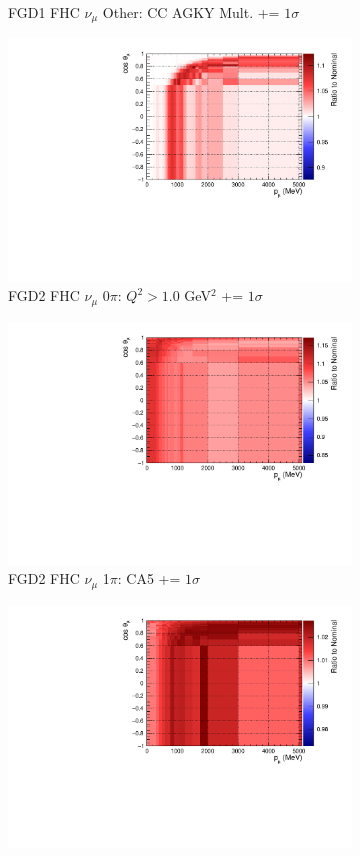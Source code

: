 \begin{figure}[!htbp]
\begin{subfigure}{.32\textwidth}
  \caption{FGD1 FHC $\nu_{\mu}$ Other: CC AGKY Mult. += $1\sigma$}
  \label{fig:sigvar_FGD1_numuCC_other}
\end{subfigure}
\centering
\begin{subfigure}{.32\textwidth}
  \centering
  \includegraphics[width=0.85\linewidth]{figs/sig/FGD2_numuCC_0pi_Q2_norm_7_+1sig.pdf}
  \caption{FGD2 FHC $\nu_{\mu}$ 0$\pi$: $Q^2 > 1.0$ GeV$^2$ += $1\sigma$}
  \label{fig:sigvar_FGD2_numuCC_0pi}
\end{subfigure}
\begin{subfigure}{.32\textwidth}
  \centering
  \includegraphics[width=0.85\linewidth]{figs/sig/FGD2_numuCC_1pi_CA5_+1sig.pdf}
  \caption{FGD2 FHC $\nu_{\mu}$ 1$\pi$: CA5 += $1\sigma$}
  \label{fig:sigvar_FGD2_numuCC_1pi}
\end{subfigure}
\begin{subfigure}{.32\textwidth}
  \centering
  \includegraphics[width=0.85\linewidth]{figs/sig/FGD2_numuCC_other_CC_DIS_MultPi_Norm_Nu_+1sig.pdf}

\end{subfigure}
\end{figure}

